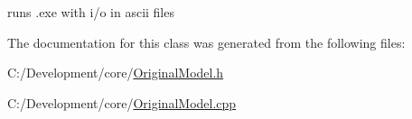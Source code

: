 runs .exe with i/o in ascii files 



The documentation for this class was generated from the following files\-:\begin{DoxyCompactItemize}
\item 
C\-:/\-Development/core/\hyperlink{_original_model_8h}{Original\-Model.\-h}\item 
C\-:/\-Development/core/\hyperlink{_original_model_8cpp}{Original\-Model.\-cpp}\end{DoxyCompactItemize}

